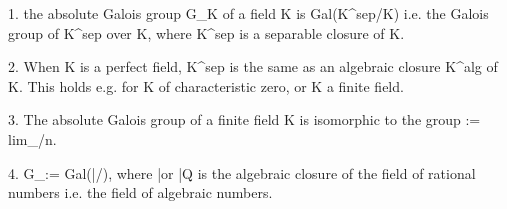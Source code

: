 
1. the absolute Galois group G_K of a field K is Gal(K^sep/K) 
i.e. the Galois group of K^sep over K, where K^sep is a separable closure of K.

2. When K is a perfect field, K^sep is the same as an algebraic closure K^alg of K. 
This holds e.g. for K of characteristic zero, or K a finite field. 

3. The absolute Galois group of a finite field K is isomorphic to the group
 := lim_\larr {}/n. 

4. G_\Q := Gal(\bar\Q/\Q), where \bar\Q or \bar Q is the algebraic closure of 
the field of rational numbers i.e. the field of algebraic numbers.
